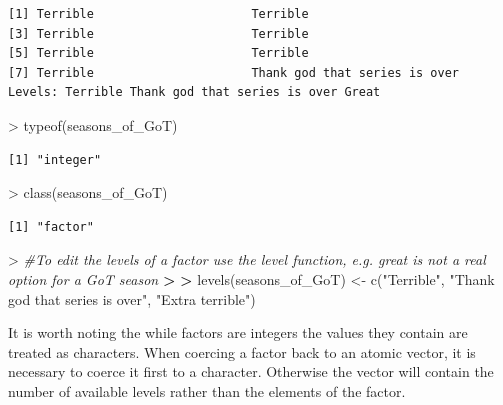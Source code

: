 \documentclass[
]{book}
\newenvironment{Shaded}{\begin{snugshade}}{\end{snugshade}}
\newcommand{\CommentTok}[1]{\textcolor[rgb]{0.56,0.35,0.01}{\textit{#1}}}
\newcommand{\ErrorTok}[1]{\textcolor[rgb]{0.64,0.00,0.00}{\textbf{#1}}}
\newcommand{\FunctionTok}[1]{\textcolor[rgb]{0.00,0.00,0.00}{#1}}
\newcommand{\NormalTok}[1]{#1}
\newcommand{\OtherTok}[1]{\textcolor[rgb]{0.56,0.35,0.01}{#1}}
\newcommand{\SpecialCharTok}[1]{\textcolor[rgb]{0.00,0.00,0.00}{#1}}
\newcommand{\StringTok}[1]{\textcolor[rgb]{0.31,0.60,0.02}{#1}}
\theoremstyle{definition}
\theoremstyle{definition}
\theoremstyle{definition}
\theoremstyle{definition}
\theoremstyle{remark}
\begin{document}
\begin{verbatim}
[1] Terrible                      Terrible                     
[3] Terrible                      Terrible                     
[5] Terrible                      Terrible                     
[7] Terrible                      Thank god that series is over
Levels: Terrible Thank god that series is over Great
\end{verbatim}

\begin{Shaded}
\begin{Highlighting}[]
\SpecialCharTok{\textgreater{}} \FunctionTok{typeof}\NormalTok{(seasons\_of\_GoT)}
\end{Highlighting}
\end{Shaded}

\begin{verbatim}
[1] "integer"
\end{verbatim}

\begin{Shaded}
\begin{Highlighting}[]
\SpecialCharTok{\textgreater{}} \FunctionTok{class}\NormalTok{(seasons\_of\_GoT)}
\end{Highlighting}
\end{Shaded}

\begin{verbatim}
[1] "factor"
\end{verbatim}

\begin{Shaded}
\begin{Highlighting}[]
\SpecialCharTok{\textgreater{}} \CommentTok{\#To edit the levels of a factor use the level function, e.g. great is not a real option for a GoT season}
\ErrorTok{\textgreater{}} 
\ErrorTok{\textgreater{}} \FunctionTok{levels}\NormalTok{(seasons\_of\_GoT) }\OtherTok{\textless{}{-}} \FunctionTok{c}\NormalTok{(}\StringTok{"Terrible"}\NormalTok{, }\StringTok{"Thank god that series is over"}\NormalTok{, }\StringTok{"Extra terrible"}\NormalTok{)}
\end{Highlighting}
\end{Shaded}

It is worth noting the while factors are integers the values they contain are treated as characters. When coercing a
factor back to an atomic vector, it is necessary to coerce it first to a character. Otherwise the vector will contain
the number of available levels rather than the elements of the factor.
\end{document}
